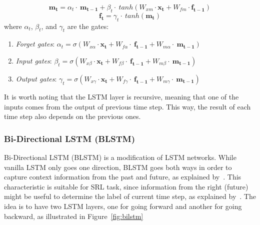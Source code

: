 \begin{equation}\label{eq:lstmm}
\mathbf{m_{t}}=\alpha_{t}\cdot~\mathbf{m_{t-1}} + \beta_{t}\cdot~tanh(W_{xm} \cdot \mathbf{x_{t}} + W_{fm} \cdot \mathbf{f_{t-1}})
\end{equation}
\begin{equation}\label{eq:lstmh}
\mathbf{f_{t}}=\gamma_{t}\cdot~tanh(\mathbf{m_{t}})
\end{equation}
where
$ \alpha_t $, $ \beta_t $, and $ \gamma_t $ are the gates:
\begin{enumerate}
	\item \textit{Forget gates}: $ \alpha_{t}=\sigma(W_{x\alpha} \cdot \mathbf{x_{t}}+W_{f\alpha}\cdot~\mathbf{f_{t-1}}+W_{m\alpha}\cdot~\mathbf{m_{t-1}}) $
	\item \textit{Input gates}: $ \beta_{t}=\sigma(W_{x\beta}\cdot \mathbf{x_{t}}+W_{f\beta}\cdot~\mathbf{f_{t-1}}+W_{m\beta}\cdot~\mathbf{m_{t-1}}) $
	\item \textit{Output gates}: $ \gamma_{t}=\sigma(W_{x\gamma}\cdot \mathbf{x_{t}}+W_{f\gamma}\cdot~\mathbf{f_{t-1}}+W_{m\gamma}\cdot~\mathbf{m_{t-1}}) $
\end{enumerate}

It is worth noting that the LSTM layer is recursive, meaning that one of the inputs comes from the output of previous time step. This way, the result of each time step also depends on the previous ones.


\subsubsection{Bi-Directional LSTM (BLSTM)}
\label{sec:blstm}
Bi-Directional LSTM (BLSTM) is a modification of LSTM networks. While vanilla LSTM only goes one direction, BLSTM goes both ways in order to capture context information from the past and future, as explained by~\cite{zhou2015end}. This characteristic is suitable for SRL task, since information from the right (future) might be useful to determine the label of current time step, as explained by~\cite{zhou2015end}. The idea is to have two LSTM layers, one for going forward and another for going backward, as illustrated in Figure~\ref{fig:bilstm}

